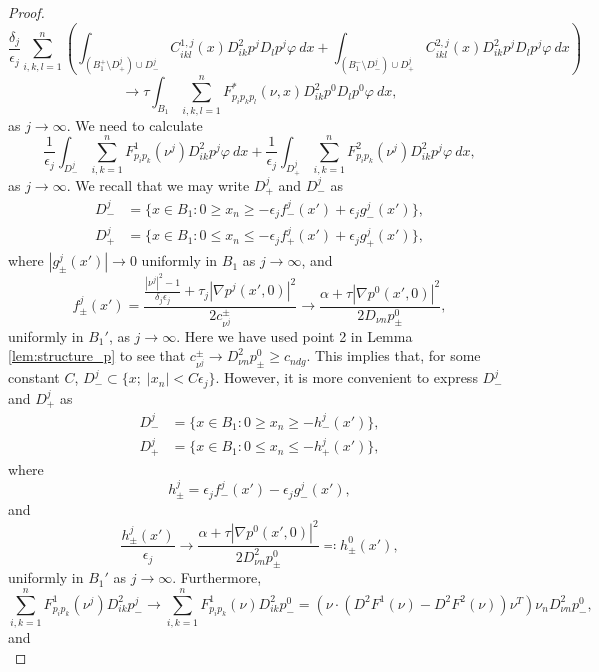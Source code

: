 \documentclass[10pt,a4paper]{amsart}
\begin{document}
\begin{proof}
 $$
 \frac{\delta_j}{\epsilon_j} \sum_{i, k, l = 1}^n \left(\int_{(B^+_1 \setminus D^j_+) \cup D^j_-}   C^{1,j}_{ikl}(x) D^2_{ik} p^j D_l p^j \varphi \ dx +\int_{(B^-_1 \setminus D^j_-) \cup D^j_+ }  C^{2,j}_{ikl}(x) D^2_{ik} p^j D_l p^j \varphi \ dx \right)
 $$
\begin{equation}\label{eq:num3}
   \to \tau \int_{B_1} \sum_{i, k, l = 1}^n   F^*_{p_ip_k p_l}(\nu,x) D^2_{ik} p^0 D_l p^0 \varphi \ dx,  
\end{equation}
as $j \to \infty$. 
We need to calculate
$$
\frac{1}{\epsilon_j} \int_{D^j_-}  \sum_{i, k = 1}^n   F^1_{p_i p_k}(\nu^j) D^2_{ik} p^j \varphi \ dx + \frac{1}{\epsilon_j} \int_{D^j_+}  \sum_{i, k = 1}^n   F^2_{p_i p_k}(\nu^j) D^2_{ik} p^j \varphi \ dx,
$$
as $j \to  \infty$. We recall that we may write $D^j_+$ and $D^j_-$ as
\begin{align*}
    D^j_- &= \{x\in B_1 :0 \geq x_n \geq - \epsilon_j f^j_-(x') + \epsilon_j g^j_-(x') \}, \\
    D^j_+ &= \{x \in B_1 :0 \leq x_n \leq -  \epsilon_j f^j_+(x') + \epsilon_j g^j_+(x') \}, 
\end{align*}
where $|g_{\pm}^j(x')| \to 0$ uniformly in $B_1$ as $j \to \infty$, and 
$$
f^j_{\pm}(x') = \frac{\frac{|\nu^j|^2-1}{\delta_j \epsilon_j} + \tau_j|\nabla p^j(x',0)|^2}{2 c^{\pm}_{\nu^j}}  \to \frac{\alpha + \tau|\nabla p^0(x',0)|^2}{2D_{\nu n} p^0_{\pm}},
$$
uniformly in $B_1'$, as $j \to \infty$. Here we have used point 2 in Lemma \ref{lem:structure_p} to see that $c_{\nu^j}^{ \pm} \to D^2_{\nu n}p^0_{\pm} \geq c_{ndg}$. This implies that, for some constant $C$, $D^j_- \subset \{x;\; |x_n|<C\epsilon_j\}$. However, it is more convenient to express $D^j_-$ and $D^j_+$ as 
\begin{align*}
    D^j_- &= \{x\in B_1 :0 \geq x_n \geq - h^j_-(x') \}, \\
    D^j_+ &= \{x \in B_1 :0 \leq x_n \leq - h^j_+(x') \},
\end{align*}
where
\begin{equation*}\label{eq:hjtoh0}
    h^j_{\pm} =  \epsilon_j f^j_-(x') - \epsilon_j g^j_-(x'),
\end{equation*}
and 
$$
\frac{h^j_{\pm}(x')}{\epsilon_j} \to \frac{\alpha + \tau |\nabla p^0(x',0)|^2}{2 D^2_{\nu n} p^0_{\pm}} \eqqcolon h^0_{\pm}(x'), 
$$ 
uniformly in $B_1'$ as $j \to \infty$. Furthermore,
$$
        \sum_{i, k = 1}^n F^1_{p_i p_k}(\nu^j)D^2_{ik} p_-^j  \to \sum_{i, k = 1}^n F^1_{p_i p_k}(\nu)D^2_{ik} p_-^0 = (\nu \cdot (D^2 F^1 (\nu)-D^2 F^2(\nu)) \nu^T) \nu_n D^2_{\nu n}p^0_-,
 $$  
 and
 $$
$$
\end{proof}
\end{document}
